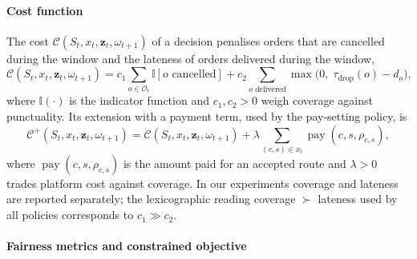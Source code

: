\documentclass[a4paper,11pt,review,3p,authoryear]{elsarticle}
\DeclareMathOperator{\pay}{pay}
\begin{document}
\paragraph{Cost function}

The cost $\mathcal{C}(S_t, x_t, \mathbf{z}_t, \omega_{t+1})$ of a decision penalises orders that are cancelled during the window and the lateness of orders delivered during the window,
\begin{equation}
\mathcal{C}(S_t, x_t, \mathbf{z}_t, \omega_{t+1}) = c_1 \sum_{o \in \mathcal{O}_t} \mathbb{I}[o \text{ cancelled}] + c_2 \sum_{o \text{ delivered}} \max\bigl(0,\; \tau_{\text{drop}}(o) - d_o\bigr),
\label{eqn:cost}
\end{equation}
where $\mathbb{I}(\cdot)$ is the indicator function and $c_1, c_2 > 0$ weigh coverage against punctuality. Its extension with a payment term, used by the pay-setting policy, is
\begin{equation}
\mathcal{C}^{+}(S_t, x_t, \mathbf{z}_t, \omega_{t+1}) = \mathcal{C}(S_t, x_t, \mathbf{z}_t, \omega_{t+1}) + \lambda \sum_{(c,s) \in x_t} \pay(c, s, \rho_{c,s}),
\label{eqn:cost_plus}
\end{equation}
where $\pay(c,s,\rho_{c,s})$ is the amount paid for an accepted route and $\lambda > 0$ trades platform cost against coverage. In our experiments coverage and lateness are reported separately; the lexicographic reading coverage $\succ$ lateness used by all policies corresponds to $c_1 \gg c_2$.

\paragraph{Fairness metrics and constrained objective}
\end{document}
